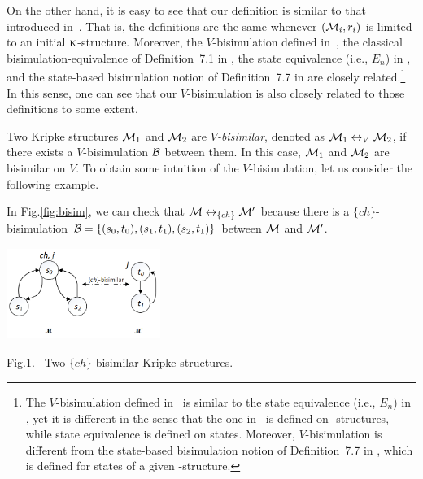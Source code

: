 \documentclass[runningheads]{llncs}
\begin{document}
On the other hand, it is easy to see that our definition is similar to that introduced in~\cite{renyansfirstpaper}. That is, the definitions are the same whenever $({\cal M}_i, r_i)$ is limited to an initial $\textsc{k}$-structure.
Moreover, the $V$-bisimulation defined in~\cite{renyansfirstpaper}, the classical
bisimulation-equivalence of Definition~7.1 in \cite{Baier:PMC:2008}, the state equivalence (i.e., $E_n$) in \cite{browne1988characterizing}, and the state-based bisimulation notion of Definition~7.7 in \cite{Baier:PMC:2008} are closely related.\footnote{The $V$-bisimulation defined in~\cite{renyansfirstpaper} is similar to
	the state equivalence (i.e., $E_n$) in \cite{browne1988characterizing}, yet it is
	different in the sense that the one in~\cite{renyansfirstpaper} is defined on \MPK-structures,
	while state equivalence is defined on states.
	Moreover, $V$-bisimulation is different
	from  the state-based bisimulation notion of Definition~7.7 in \cite{Baier:PMC:2008},
	which is defined for states of a given \MPK-structure.}
In this sense, one can see that our $V$-bisimulation is also closely related to those definitions to some extent.

Two Kripke structures ${\cal M}_1$ and ${\cal M}_2$ are \emph{$V$-bisimilar}, denoted as ${\cal M}_1 \leftrightarrow_V {\cal M}_2$, if there exists a $V$-bisimulation ${\cal B}$ between them.
In this case, ${\cal M}_1$ and ${\cal M}_2$ are bisimilar on $V$.
To obtain  some intuition of the $V$-bisimulation, let us consider the following example.

\begin{example}
	In Fig.\ref{fig:bisim}, we can check that ${\cal M} \leftrightarrow_{\{ch\}} {\cal M}'$ because there is a $\{ch\}$-bisimulation ${\cal B}=\{(s_0, t_0), (s_1, t_1), (s_2, t_1)\}$ between ${\cal M}$ and ${\cal M}'$.
	
	
	\begin{center}\label{fig:bisim}
		\includegraphics[width=5cm,height=3cm]{chBisimilar.png}\\
		\parbox[c]{6cm}{\footnotesize{Fig.1.~}  Two $\{ch\}$-bisimilar Kripke structures.}%
	\end{center}
	
	
\end{example}
\end{document}
